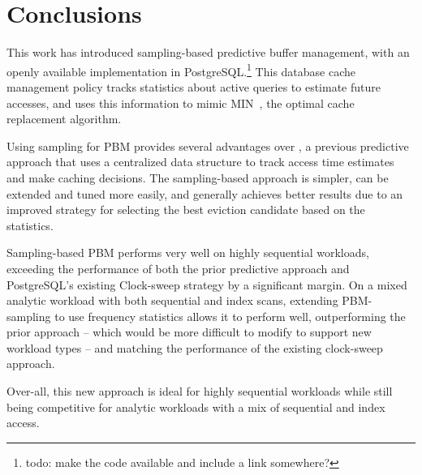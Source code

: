 
\chapter{Conclusions}

This work has introduced sampling-based predictive buffer management, with an openly available implementation in PostgreSQL.\footnote{todo: make the code available and include a link somewhere?} This database cache management policy tracks statistics about active queries to estimate future accesses, and uses this information to mimic MIN~\cite{beladyMIN}, the optimal cache replacement algorithm.

Using sampling for PBM provides several advantages over \cite{pbm}, a previous predictive approach that uses a centralized data structure to track access time estimates and make caching decisions. The sampling-based approach is simpler, can be extended and tuned more easily, and generally achieves better results due to an improved strategy for selecting the best eviction candidate based on the statistics.

Sampling-based PBM performs very well on highly sequential workloads, exceeding the performance of both the prior predictive approach and PostgreSQL's existing Clock-sweep strategy by a significant margin. On a mixed analytic workload with both sequential and index scans, extending PBM-sampling to use frequency statistics allows it to perform well, outperforming the prior approach -- which would be more difficult to modify to support new workload types -- and matching the performance of the existing clock-sweep approach.

Over-all, this new approach is ideal for highly sequential workloads while still being competitive for analytic workloads with a mix of sequential and index access.


